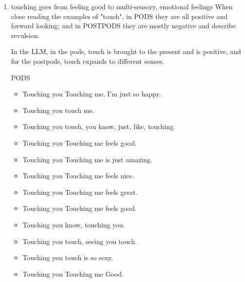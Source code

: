\documentclass[11pt]{article}
\begin{document}
\begin{enumerate}
\begin{enumerate}
POSTPODS
\begin{itemize}
\item My body is so, like, tight and, like, tight.
\item My body is very, very physical.
\item My body is gorgeous.
\item My body is so cute.
\item My body is so pretty, you know.
\item My body is gorgeous, and my soul is so beautiful.
\item My body is so pretty, but my heart is so pretty, you know.
\item My body, you know, I'm not sure if I would fit in here.
\item My body makes me feel like I've missed my train.
\item My body makes me feel uncomfortable.
\item My body makes me feel so, like, so, like, so, like, vulnerable.
\item My body makes me feel so icky.
\item My body makes me feel like I can be more aggressive, more
aggressive.
\end{itemize}

\item touching goes from feeling good to multi-sensory, emotional feelings
\label{sec:orgab67e7e}
When close reading the examples of "touch", in PODS they are all
positive and forward looking; and in POSTPODS they are mostly negative
and describe revulsion.

In the LLM, in the pods, touch is brought to the present and is
positive, and for the postpods, touch expands to different senses. 

PODS
\begin{itemize}
\item Touching you Touching me, I'm just so happy.
\item Touching you touch me.
\item Touching you touch, you know, just, like, touching.
\item Touching you Touching me feels good.
\item Touching you Touching me is just amazing.
\item Touching you Touching me feels nice.
\item Touching you Touching me feels great.
\item Touching you Touching me feels good.
\item Touching you know, touching you.
\item Touching you touch, seeing you touch.
\item Touching you touch is so sexy.
\item Touching you Touching me Good.
\end{itemize}


\end{enumerate}
\end{enumerate}
\end{document}
